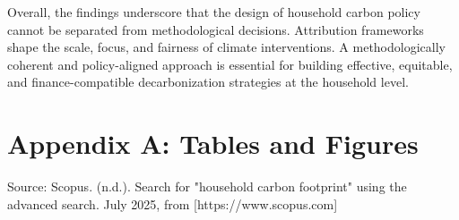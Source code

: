 \documentclass[12pt,a4paper]{article}%
\begin{document}
Overall, the findings underscore that the design of household carbon policy cannot be separated from methodological decisions. Attribution frameworks shape the scale, focus, and fairness of climate interventions. A methodologically coherent and policy-aligned approach is essential for building effective, equitable, and finance-compatible decarbonization strategies at the household level.

\newpage

\appendix
\section*{Appendix A: Tables and Figures}

\renewcommand{\thetable}{A\arabic{table}}
\renewcommand{\thefigure}{A\arabic{figure}}
\setcounter{table}{0}
\setcounter{figure}{0}


\begin{table}[H]
\captionsetup{justification=raggedright,singlelinecheck=false} 
\caption{Annual number of publications, cumulative total, and estimated annual growth rate in household carbon footprint literature (2000–2025).}
\raggedright
\vspace{0.3cm}

\footnotesize Source: Scopus. (n.d.). Search for "household carbon footprint" using the advanced search. July 2025, from [https://www.scopus.com]
\end{table}
\end{document}
